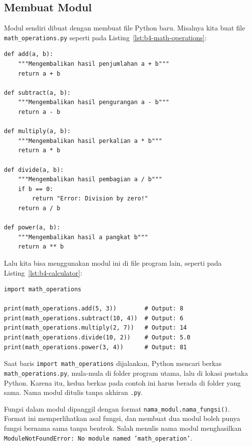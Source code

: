 \subsection{Membuat Modul}

Modul sendiri dibuat dengan membuat file Python baru. Misalnya kita buat file \texttt{math_operations.py} seperti pada Listing~\ref{lst:b4-math-operations}:

\begin{lstlisting}[style=PythonStyle, caption={Kode Python: math_operations.py}, label={lst:b4-math-operations}]
def add(a, b):
    """Mengembalikan hasil penjumlahan a + b"""
    return a + b

def subtract(a, b):
    """Mengembalikan hasil pengurangan a - b"""
    return a - b

def multiply(a, b):
    """Mengembalikan hasil perkalian a * b"""
    return a * b

def divide(a, b):
    """Mengembalikan hasil pembagian a / b"""
    if b == 0:
        return "Error: Division by zero!"
    return a / b

def power(a, b):
    """Mengembalikan hasil a pangkat b"""
    return a ** b
\end{lstlisting}

Lalu kita bisa menggunakan modul ini di file program lain, seperti pada Listing~\ref{lst:b4-calculator}:

\begin{lstlisting}[style=PythonStyle, caption={Kode Python: calculator.py}, label={lst:b4-calculator}]
import math_operations

print(math_operations.add(5, 3))        # Output: 8
print(math_operations.subtract(10, 4))  # Output: 6
print(math_operations.multiply(2, 7))   # Output: 14
print(math_operations.divide(10, 2))    # Output: 5.0
print(math_operations.power(3, 4))      # Output: 81
\end{lstlisting}

Saat baris \texttt{import math_operations} dijalankan, Python mencari berkas \texttt{math_operations.py}, mula-mula di folder program utama, lalu di lokasi pustaka Python. Karena itu, kedua berkas pada contoh ini harus berada di folder yang sama. Nama modul ditulis tanpa akhiran \texttt{.py}.

Fungsi dalam modul dipanggil dengan format \texttt{nama_modul.nama_fungsi()}. Format ini memperlihatkan asal fungsi, dan membuat dua modul boleh punya fungsi bernama sama tanpa bentrok. Salah menulis nama modul menghasilkan \texttt{ModuleNotFoundError: No module named 'math_operation'}.

